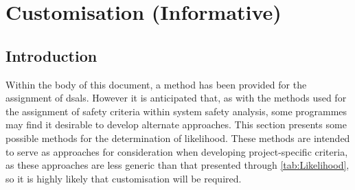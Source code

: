 %
%
\chapter{ Customisation (Informative)} \label{bkm:DsalCustomisation}


\section{Introduction}
Within the body of this document, a method has been provided for the assignment of \glspl{dsal}. However it is anticipated that, as with the methods used for the assignment of safety criteria within system safety analysis, some programmes may find it desirable to develop alternate approaches. This section presents some possible methods for the determination of likelihood. These methods are intended to serve as approaches for consideration when developing project-specific criteria, as these approaches are less generic than that presented through \autoref {tab:Likelihood}, so it is highly likely that customisation will be required.

